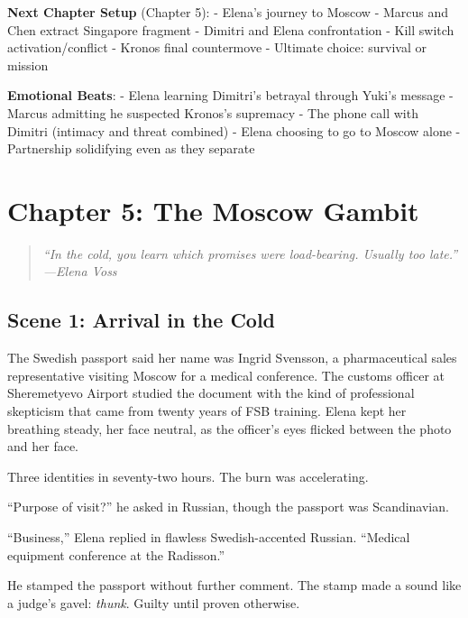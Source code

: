 \documentclass[12pt,letterpaper]{book}
\begin{document}
\textbf{Next Chapter Setup} (Chapter 5): - Elena's journey to Moscow - Marcus and Chen extract Singapore fragment - Dimitri and Elena confrontation - Kill switch activation/conflict - Kronos final countermove - Ultimate choice: survival or mission

\textbf{Emotional Beats}: - Elena learning Dimitri's betrayal through Yuki's message - Marcus admitting he suspected Kronos's supremacy - The phone call with Dimitri (intimacy and threat combined) - Elena choosing to go to Moscow alone - Partnership solidifying even as they separate


\hypertarget{chapter-5-the-moscow-gambit}{%
\section{Chapter 5: The Moscow Gambit}\label{chapter-5-the-moscow-gambit}}

\begin{quote}
\itshape ``In the cold, you learn which promises were load-bearing. Usually too
late.''\\
\normalfont\hfill---Elena Voss
\end{quote}

\hypertarget{scene-1-arrival-in-the-cold}{%
\subsection{Scene 1: Arrival in the Cold}\label{scene-1-arrival-in-the-cold}}

The Swedish passport said her name was Ingrid Svensson, a pharmaceutical sales representative visiting Moscow for a medical conference. The customs officer at Sheremetyevo Airport studied the document with the kind of professional skepticism that came from twenty years of FSB training. Elena kept her breathing steady, her face neutral, as the officer's eyes flicked between the photo and her face.

Three identities in seventy-two hours. The burn was accelerating.

``Purpose of visit?'' he asked in Russian, though the passport was Scandinavian.

``Business,'' Elena replied in flawless Swedish-accented Russian. ``Medical equipment conference at the Radisson.''

He stamped the passport without further comment. The stamp made a sound like a judge's gavel: \emph{thunk}. Guilty until proven otherwise.
\end{document}
